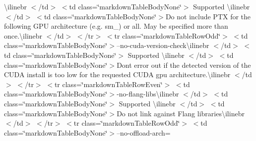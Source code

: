 \begin{longtabu}
{\ttfamily \textbackslash{}ilinebr \texorpdfstring{$<$}{<}/td\texorpdfstring{$>$}{>} \texorpdfstring{$<$}{<}td class=\char`\"{}markdown\+Table\+Body\+None\char`\"{}\texorpdfstring{$>$}{>} Supported \textbackslash{}ilinebr \texorpdfstring{$<$}{<}/td\texorpdfstring{$>$}{>} \texorpdfstring{$<$}{<}td class=\char`\"{}markdown\+Table\+Body\+None\char`\"{}\texorpdfstring{$>$}{>}}Do not include PTX for the following GPU architecture (e.\+g. sm\+\_) or \textquotesingle{}all\textquotesingle{}. May be specified more than once.{\ttfamily \textbackslash{}ilinebr \texorpdfstring{$<$}{<}/td\texorpdfstring{$>$}{>} \texorpdfstring{$<$}{<}/tr\texorpdfstring{$>$}{>} \texorpdfstring{$<$}{<}tr class=\char`\"{}markdown\+Table\+Row\+Odd\char`\"{}\texorpdfstring{$>$}{>} \texorpdfstring{$<$}{<}td class=\char`\"{}markdown\+Table\+Body\+None\char`\"{}\texorpdfstring{$>$}{>}}--no-\/cuda-\/version-\/check{\ttfamily \textbackslash{}ilinebr \texorpdfstring{$<$}{<}/td\texorpdfstring{$>$}{>} \texorpdfstring{$<$}{<}td class=\char`\"{}markdown\+Table\+Body\+None\char`\"{}\texorpdfstring{$>$}{>} Supported \textbackslash{}ilinebr \texorpdfstring{$<$}{<}/td\texorpdfstring{$>$}{>} \texorpdfstring{$<$}{<}td class=\char`\"{}markdown\+Table\+Body\+None\char`\"{}\texorpdfstring{$>$}{>}}Don\textquotesingle{}t error out if the detected version of the CUDA install is too low for the requested CUDA gpu architecture.{\ttfamily \textbackslash{}ilinebr \texorpdfstring{$<$}{<}/td\texorpdfstring{$>$}{>} \texorpdfstring{$<$}{<}/tr\texorpdfstring{$>$}{>} \texorpdfstring{$<$}{<}tr class=\char`\"{}markdown\+Table\+Row\+Even\char`\"{}\texorpdfstring{$>$}{>} \texorpdfstring{$<$}{<}td class=\char`\"{}markdown\+Table\+Body\+None\char`\"{}\texorpdfstring{$>$}{>}}-\/no-\/flang-\/libs{\ttfamily \textbackslash{}ilinebr \texorpdfstring{$<$}{<}/td\texorpdfstring{$>$}{>} \texorpdfstring{$<$}{<}td class=\char`\"{}markdown\+Table\+Body\+None\char`\"{}\texorpdfstring{$>$}{>} Supported \textbackslash{}ilinebr \texorpdfstring{$<$}{<}/td\texorpdfstring{$>$}{>} \texorpdfstring{$<$}{<}td class=\char`\"{}markdown\+Table\+Body\+None\char`\"{}\texorpdfstring{$>$}{>}}Do not link against Flang libraries{\ttfamily \textbackslash{}ilinebr \texorpdfstring{$<$}{<}/td\texorpdfstring{$>$}{>} \texorpdfstring{$<$}{<}/tr\texorpdfstring{$>$}{>} \texorpdfstring{$<$}{<}tr class=\char`\"{}markdown\+Table\+Row\+Odd\char`\"{}\texorpdfstring{$>$}{>} \texorpdfstring{$<$}{<}td class=\char`\"{}markdown\+Table\+Body\+None\char`\"{}\texorpdfstring{$>$}{>}}--no-\/offload-\/arch=


\end{longtabu}
